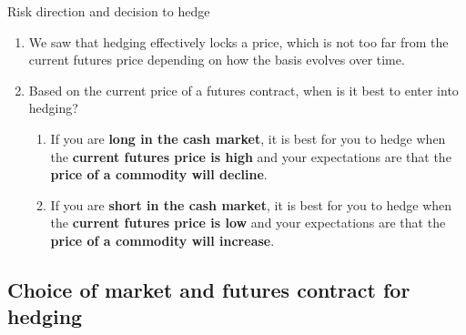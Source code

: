 \documentclass[table,xcolor=pdftex,dvipsnames]{beamer}\usepackage[]{graphicx}\usepackage[]{color}
\begin{document}
\begin{frame}{Risk direction and decision to hedge}
\begin{enumerate}[label=\textbullet]
  \item We saw that hedging effectively locks a price, which is not too far from the current futures price depending on how the basis evolves over time.
  \item Based on the current price of a futures contract, when is it best to enter into hedging?
      \begin{enumerate}[label=-]
            \item If you are \textbf{long in the cash market}, it is best for you to hedge when the\textbf{ current futures price is high} and your expectations are that the \textbf{price of a commodity will decline}.
            \item If you are \textbf{short in the cash market}, it is best for you to hedge when the\textbf{ current futures price is low} and your expectations are that the \textbf{price of a commodity will increase}.
      \end{enumerate}
\end{enumerate}
\end{frame}


\subsection{Choice of market and futures contract for hedging}
\end{document}
